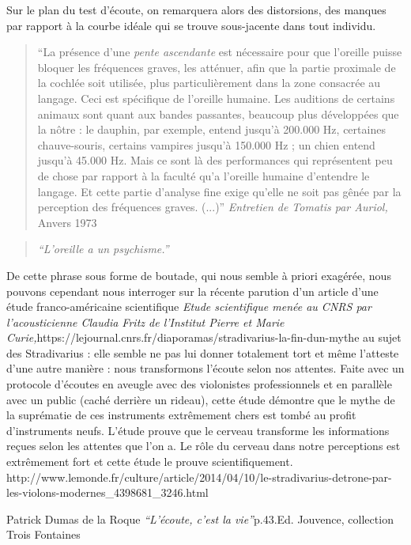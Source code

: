\documentclass[12pt,french]{report}
\makeatletter
\let\SF@@footnote\footnote
\def\footnote{\ifx\protect\@typeset@protect
    \expandafter\SF@@footnote
  \else
    \expandafter\SF@gobble@opt
  \fi
}
\edef\SF@gobble@opt{\noexpand\protect
  \expandafter\noexpand\csname SF@gobble@opt \endcsname}
\makeatother
\begin{document}
Sur le plan du test d\textquoteright écoute,\emph{ }on remarquera
alors des distorsions, des manques\emph{ }par rapport à la courbe
idéale qui se trouve sous-jacente dans tout individu. 
\begin{quotation}
``La présence d'une \emph{pente ascendante} est nécessaire pour que
l'oreille puisse bloquer les fréquences graves, les atténuer, afin
que la partie proximale de la cochlée soit utilisée, plus particulièrement
dans la zone consacrée au langage. Ceci est spécifique de l'oreille
humaine. Les auditions de certains animaux sont quant aux bandes passantes,
beaucoup plus développées que la nôtre : le dauphin, par exemple,
entend jusqu\textquoteright à 200.000 Hz, certaines chauve-souris,
certains vampires jusqu'à 150.000 Hz ; un chien entend jusqu'à 45.000
Hz. Mais ce sont là des performances qui représentent peu de chose
par rapport à la faculté qu'a l'oreille humaine d\textquoteright entendre
le langage. Et cette partie d'analyse fine exige qu'elle ne soit pas
gênée par la perception des fréquences graves. (...)''\footnote{\emph{Entretien de Tomatis par Auriol,} Anvers 1973}
\end{quotation}
\begin{quote}
\emph{``L'oreille a un psychisme.''} 
\end{quote}
De cette phrase sous forme de boutade, qui nous semble à priori exagérée,
nous pouvons cependant nous interroger sur la récente parution d'un
article d'une étude franco-américaine scientifique \footnote{\emph{Etude scientifique menée au CNRS par l'acousticienne Claudia
Fritz de l'Institut Pierre et Marie Curie,}https://lejournal.cnrs.fr/diaporamas/stradivarius-la-fin-dun-mythe} au sujet des Stradivarius : elle semble ne pas lui donner totalement
tort et même l'atteste d'une autre manière : nous transformons l'écoute
selon nos attentes. Faite avec un protocole d'écoutes en aveugle avec
des violonistes professionnels et en parallèle avec un public (caché
derrière un rideau), cette étude démontre que le mythe de la suprématie
de ces instruments extrêmement chers est tombé au profit d'instruments
neufs. L'étude prouve que le cerveau transforme les informations reçues
selon les attentes que l'on a. Le rôle du cerveau dans notre perceptions
est extrêmement fort et cette étude le prouve scientifiquement. \footnote{http://www.lemonde.fr/culture/article/2014/04/10/le-stradivarius-detrone-par-les-violons-modernes\_4398681\_3246.html }

\footnote{Patrick Dumas de la Roque \emph{``L'écoute, c'est la vie''}p.43.Ed.
Jouvence, collection Trois Fontaines}
\end{document}
